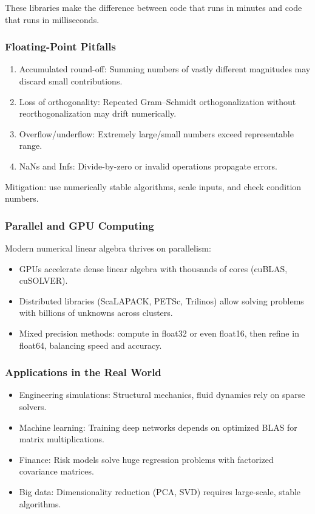 \documentclass[
  letterpaper,
  DIV=11,
  numbers=noendperiod]{scrreprt}
\providecommand{\tightlist}{%
  \setlength{\itemsep}{0pt}\setlength{\parskip}{0pt}}
\begin{document}
These libraries make the difference between code that runs in minutes
and code that runs in milliseconds.

\subsubsection{Floating-Point Pitfalls}\label{floating-point-pitfalls}

\begin{enumerate}
\def\labelenumi{\arabic{enumi}.}
\tightlist
\item
  Accumulated round-off: Summing numbers of vastly different magnitudes
  may discard small contributions.
\item
  Loss of orthogonality: Repeated Gram--Schmidt orthogonalization
  without reorthogonalization may drift numerically.
\item
  Overflow/underflow: Extremely large/small numbers exceed representable
  range.
\item
  NaNs and Infs: Divide-by-zero or invalid operations propagate errors.
\end{enumerate}

Mitigation: use numerically stable algorithms, scale inputs, and check
condition numbers.

\subsubsection{Parallel and GPU
Computing}\label{parallel-and-gpu-computing}

Modern numerical linear algebra thrives on parallelism:

\begin{itemize}
\tightlist
\item
  GPUs accelerate dense linear algebra with thousands of cores (cuBLAS,
  cuSOLVER).
\item
  Distributed libraries (ScaLAPACK, PETSc, Trilinos) allow solving
  problems with billions of unknowns across clusters.
\item
  Mixed precision methods: compute in float32 or even float16, then
  refine in float64, balancing speed and accuracy.
\end{itemize}

\subsubsection{Applications in the Real
World}\label{applications-in-the-real-world}

\begin{itemize}
\tightlist
\item
  Engineering simulations: Structural mechanics, fluid dynamics rely on
  sparse solvers.
\item
  Machine learning: Training deep networks depends on optimized BLAS for
  matrix multiplications.
\item
  Finance: Risk models solve huge regression problems with factorized
  covariance matrices.
\item
  Big data: Dimensionality reduction (PCA, SVD) requires large-scale,
  stable algorithms.
\end{itemize}
\end{document}
